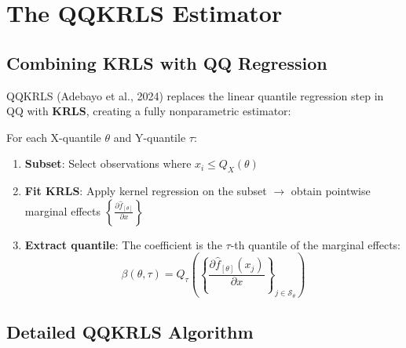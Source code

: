 \section{The QQKRLS Estimator}

\subsection{Combining KRLS with QQ Regression}

QQKRLS (Adebayo et al., 2024) replaces the linear quantile regression step in QQ with \textbf{KRLS}, creating a fully nonparametric estimator:

\begin{theorembox}
For each X-quantile $\theta$ and Y-quantile $\tau$:
\begin{enumerate}[label=\textcolor{white}{\arabic*.}]
\item \textbf{Subset}: Select observations where $x_i \leq Q_X(\theta)$
\item \textbf{Fit KRLS}: Apply kernel regression on the subset $\to$ obtain pointwise marginal effects $\left\{\frac{\partial \hat{f}_{[\theta]}}{\partial x}\right\}$
\item \textbf{Extract quantile}: The coefficient is the $\tau$-th quantile of the marginal effects:
\begin{equation}
\boxed{\beta(\theta, \tau) = Q_\tau\!\left(\left\{\frac{\partial \hat{f}_{[\theta]}(x_j)}{\partial x}\right\}_{j \in \mathcal{S}_\theta}\right)}
\end{equation}
\end{enumerate}
\end{theorembox}

\subsection{Detailed QQKRLS Algorithm}

